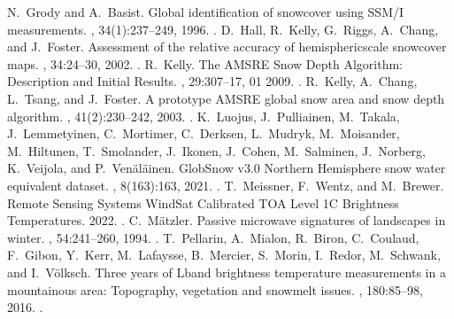 \documentclass[letterpaper,10pt,english]{jupyterBook}
\begin{document}
\begin{sphinxthebibliography}{10}
\sphinxAtStartPar
N. Grody and A. Basist. Global identification of snowcover using SSM/I measurements. , 34(1):237–249, 1996. .
\sphinxAtStartPar
D. Hall, R. Kelly, G. Riggs, A. Chang, and J. Foster. Assessment of the relative accuracy of hemispheric\sphinxhyphen{}scale snow\sphinxhyphen{}cover maps. , 34:24–30, 2002. .
\sphinxAtStartPar
R. Kelly. The AMSR\sphinxhyphen{}E Snow Depth Algorithm: Description and Initial Results. , 29:307–17, 01 2009. .
\sphinxAtStartPar
R. Kelly, A. Chang, L. Tsang, and J. Foster. A prototype AMSR\sphinxhyphen{}E global snow area and snow depth algorithm. , 41(2):230–242, 2003. .
\sphinxAtStartPar
K. Luojus, J. Pulliainen, M. Takala, J. Lemmetyinen, C. Mortimer, C. Derksen, L. Mudryk, M. Moisander, M. Hiltunen, T. Smolander, J. Ikonen, J. Cohen, M. Salminen, J. Norberg, K. Veijola, and P. Venäläinen. GlobSnow v3.0 Northern Hemisphere snow water equivalent dataset. , 8(163):163, 2021. .
\sphinxAtStartPar
T. Meissner, F. Wentz, and M. Brewer. Remote Sensing Systems WindSat Calibrated TOA Level 1C Brightness Temperatures. 2022. .
\sphinxAtStartPar
C. Mätzler. Passive microwave signatures of landscapes in winter. , 54:241–260, 1994. .
\sphinxAtStartPar
T. Pellarin, A. Mialon, R. Biron, C. Coulaud, F. Gibon, Y. Kerr, M. Lafaysse, B. Mercier, S. Morin, I. Redor, M. Schwank, and I. Völksch. Three years of L\sphinxhyphen{}band brightness temperature measurements in a mountainous area: Topography, vegetation and snowmelt issues. , 180:85–98, 2016. .

\end{sphinxthebibliography}
\end{document}
